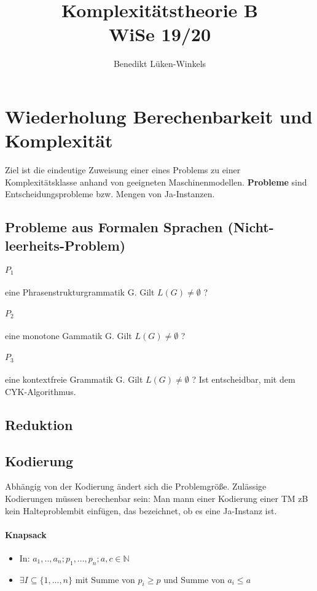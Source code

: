 \documentclass[ngerman]{scrartcl}
\title{Komplexitätstheorie B \\ WiSe 19/20}
\author{Benedikt Lüken-Winkels}
\begin{document}
\maketitle
\tableofcontents
\newpage

\section{Wiederholung Berechenbarkeit und Komplexität}
Ziel ist die eindeutige Zuweisung einer eines Problems zu einer Komplexitätsklasse anhand von geeigneten Maschinenmodellen. \textbf{Probleme} sind Entscheidungsprobleme bzw. Mengen von Ja-Instanzen. 

\subsection{Probleme aus Formalen Sprachen (Nicht-leerheits-Problem)}
\paragraph{$ P_1 $} eine Phrasenstrukturgrammatik G. Gilt $ L(G) \neq \emptyset $ ? 


\paragraph{$ P_2 $} eine monotone Gammatik G. Gilt $ L(G) \neq \emptyset $ ? 


\paragraph{$ P_3 $} eine kontextfreie Grammatik G. Gilt $ L(G) \neq \emptyset $ ? 
Ist entscheidbar, mit dem CYK-Algorithmus.

\subsection{Reduktion}


\subsection{Kodierung}
Abhängig von der Kodierung ändert sich die Problemgröße. Zulässige Kodierungen müssen berechenbar sein: Man mann einer Kodierung einer TM zB kein Halteproblembit einfügen, das bezeichnet, ob es eine Ja-Instanz ist.
\paragraph{Knapsack} 
\begin{itemize}
    \item In: $ a_1,..,a_n; p_1,...,p_n; a,c \in \mathbb{N} $
    \item $ \exists I \subseteq \{ 1,...,n \} $ mit Summe von $ p_i \geq p$ und Summe von $ a_i \leq a$
\end{itemize}
\end{document}
